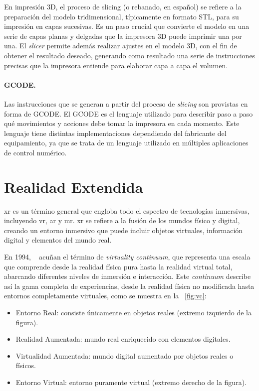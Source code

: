 En impresión 3D, el proceso de slicing (o rebanado, en español) se refiere a la preparación del modelo tridimensional, típicamente en formato STL, para su impresión en capas sucesivas. Es un paso crucial que convierte el modelo en una serie de capas planas y delgadas que la impresora 3D puede imprimir una por una.
El \emph{slicer} permite además realizar ajustes en el modelo 3D, con el fin de obtener el resultado deseado, generando como resultado una serie de instrucciones precisas que la impresora entiende para elaborar capa a capa el volumen.

\paragraph{GCODE.} Las instrucciones que se generan a partir del proceso de \emph{slicing} son provistas en forma de GCODE. El GCODE es el lenguaje utilizado para describir paso a paso qué movimientos y acciones debe tomar la impresora en cada momento. Este lenguaje tiene distintas implementaciones dependiendo del fabricante del equipamiento, ya que se trata de un lenguaje utilizado en múltiples aplicaciones de control numérico.

\section{Realidad Extendida}

\acrfull{xr} es un término general que engloba todo el espectro de tecnologías inmersivas, incluyendo \acrfull{vr}, \acrfull{ar} y \acrfull{mr}. \acrshort{xr} se refiere a la fusión de los mundos físico y digital, creando un entorno inmersivo que puede incluir objetos virtuales, información digital y elementos del mundo real.

En 1994, \citeauthor{Milgram1994ATO}~\cite{Milgram1994ATO} acuñan el término de \emph{virtuality continuum}, que representa una escala que comprende desde la realidad física pura hasta la realidad virtual total, abarcando diferentes niveles de inmersión e interacción. Este \emph{continuum} describe así la gama completa de experiencias, desde la realidad física no modificada hasta entornos completamente virtuales, como se muestra en la \figurename~\ref{fig:vc}:
\begin{itemize}
	\item Entorno Real: consiste únicamente en objetos reales (extremo izquierdo de la figura).
	\item Realidad Aumentada: mundo real enriquecido con elementos digitales.
	\item Virtualidad Aumentada: mundo digital aumentado por objetos reales o físicos.
	\item Entorno Virtual: entorno puramente virtual (extremo derecho de la figura).
\end{itemize}

